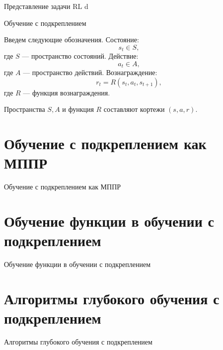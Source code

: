 \documentclass[10pt,aspectratio=169]{beamer}
\begin{document}
\begin{frame}{Представление задачи RL}
	d
\end{frame}

\begin{frame}{Обучение с подкреплением}
	
	Введем следующие обозначения.
	Состояние:
	\begin{equation}
		s_t\in S,
	\end{equation}
	где $S$ --- пространство состояний.
	Действие:
	\begin{equation}
		a_t\in A,
	\end{equation}
	где $A$ --- пространство действий.
	Вознаграждение:
	\begin{equation}
		r_t=R\left(s_t,a_t,s_{t+1}\right),
	\end{equation}
	где $R$ --- функция вознаграждения.
	
	Пространства $S, A$ и функция $R$ составляют кортежи $\left(s, a, r\right)$.
	
\end{frame}




\section{Обучение с подкреплением как МППР}

\begin{frame}{Обучение с подкреплением как МППР}
	
\end{frame}

\section{Обучение функции в обучении с подкреплением}

\begin{frame}{Обучение функции в обучении с подкреплением}
	
\end{frame}

\section{Алгоритмы глубокого обучения с подкреплением}

\begin{frame}{Алгоритмы глубокого обучения с подкреплением}
	
\end{frame}
\end{document}
